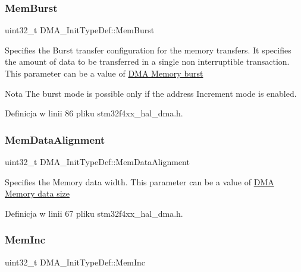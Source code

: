 \subsubsection{\texorpdfstring{Mem\+Burst}{MemBurst}}
{\footnotesize\ttfamily uint32\+\_\+t D\+M\+A\+\_\+\+Init\+Type\+Def\+::\+Mem\+Burst}

Specifies the Burst transfer configuration for the memory transfers. It specifies the amount of data to be transferred in a single non interruptible transaction. This parameter can be a value of \hyperlink{group___d_m_a___memory__burst}{D\+MA Memory burst} \begin{DoxyNote}{Nota}
The burst mode is possible only if the address Increment mode is enabled. 
\end{DoxyNote}


Definicja w linii 86 pliku stm32f4xx\+\_\+hal\+\_\+dma.\+h.

\mbox{\label{struct_d_m_a___init_type_def_a7784efedc4a61325fa7364fcace10136}} 
\subsubsection{\texorpdfstring{Mem\+Data\+Alignment}{MemDataAlignment}}
{\footnotesize\ttfamily uint32\+\_\+t D\+M\+A\+\_\+\+Init\+Type\+Def\+::\+Mem\+Data\+Alignment}

Specifies the Memory data width. This parameter can be a value of \hyperlink{group___d_m_a___memory__data__size}{D\+MA Memory data size} 

Definicja w linii 67 pliku stm32f4xx\+\_\+hal\+\_\+dma.\+h.

\mbox{\label{struct_d_m_a___init_type_def_a49b187ba5ab8ba4354e02837e8b99414}} 
\subsubsection{\texorpdfstring{Mem\+Inc}{MemInc}}
{\footnotesize\ttfamily uint32\+\_\+t D\+M\+A\+\_\+\+Init\+Type\+Def\+::\+Mem\+Inc}

